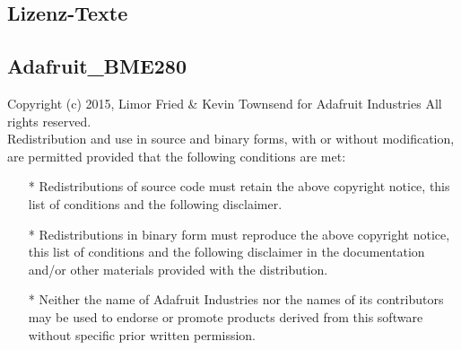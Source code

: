 \begin{appendix}

 

\newpage

 

\newpage

\section{Lizenz-Texte}
\label{sec:lizenztexte}
\subsection{Adafruit\_BME280}
\label{subsec:adafruit_bme280_lizenztext}
Copyright (c) 2015, Limor Fried \& Kevin Townsend for Adafruit Industries 
All rights reserved.\\

Redistribution and use in source and binary forms, with or without 
modification, are permitted provided that the following conditions are met:
\begin{itemize}
	\item[*] Redistributions of source code must retain the above copyright notice, this list of conditions and the following disclaimer.
	\item[*] Redistributions in binary form must reproduce the above copyright notice, this list of conditions and the following disclaimer in the documentation and/or other materials provided with the distribution.
	\item[*] Neither the name of Adafruit Industries nor the names of its contributors may be used to endorse or promote products derived from this software without specific prior written permission.\\
\end{itemize}


\end{appendix}
